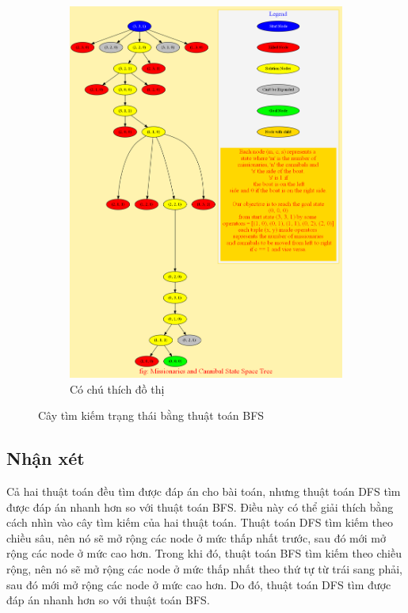 \documentclass[a4paper, 11pt]{article}
\begin{document}
\begin{figure}
\begin{subfigure}[b]{0.5\textwidth}
        \includegraphics[width=\textwidth]{bfs_legend.png}
        \caption{Có chú thích đồ thị}
    \end{subfigure}
    \caption{Cây tìm kiếm trạng thái bằng thuật toán BFS}
\end{figure}

\clearpage

\subsection{Nhận xét}
Cả hai thuật toán đều tìm được đáp án cho bài toán, nhưng thuật toán DFS tìm được đáp án nhanh hơn so với thuật toán BFS. Điều này có thể giải thích bằng cách nhìn vào cây tìm kiếm của hai thuật toán. Thuật toán DFS tìm kiếm theo chiều sâu, nên nó sẽ mở rộng các node ở mức thấp nhất trước, sau đó mới mở rộng các node ở mức cao hơn. Trong khi đó, thuật toán BFS tìm kiếm theo chiều rộng, nên nó sẽ mở rộng các node ở mức thấp nhất theo thứ tự từ trái sang phải, sau đó mới mở rộng các node ở mức cao hơn. Do đó, thuật toán DFS tìm được đáp án nhanh hơn so với thuật toán BFS.
\end{document}
